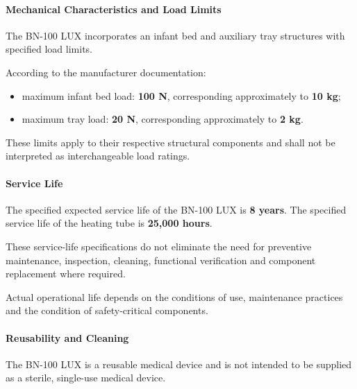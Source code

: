 \paragraph{Mechanical Characteristics and Load Limits}

The BN-100 LUX incorporates an infant bed and auxiliary tray
structures with specified load limits.

According to the manufacturer documentation:

\begin{itemize}
    \item maximum infant bed load: \textbf{100 N},
    corresponding approximately to \textbf{10 kg};
    \item maximum tray load: \textbf{20 N},
    corresponding approximately to \textbf{2 kg}.
\end{itemize}

These limits apply to their respective structural components
and shall not be interpreted as interchangeable load ratings.


\paragraph{Service Life}

The specified expected service life of the BN-100 LUX is
\textbf{8 years}. The specified service life of the heating
tube is \textbf{25,000 hours}.

These service-life specifications do not eliminate the need
for preventive maintenance, inspection, cleaning, functional
verification and component replacement where required.

Actual operational life depends on the conditions of use,
maintenance practices and the condition of safety-critical
components.


\paragraph{Reusability and Cleaning}

The BN-100 LUX is a reusable medical device and is not intended
to be supplied as a sterile, single-use medical device.

